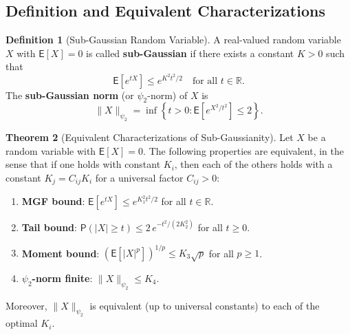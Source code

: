 \documentclass[12pt,a4paper]{article}
\theoremstyle{definition}
\newtheorem{theorem}{Theorem}[section]
\newtheorem{definition}[theorem]{Definition}
\newcommand\expc{\mathsf{E}}
\newcommand\prb{\mathsf{P}}
\newcommand{\Real}{\mathbb{R}}
\begin{document}
\subsection{Definition and Equivalent Characterizations}

\begin{definition}[Sub-Gaussian Random Variable]\label{def:subgaussian}
A real-valued random variable $X$ with $\expc[X] = 0$ is called \textbf{sub-Gaussian} if there exists a constant $K > 0$ such that
\begin{equation}\label{eq:subgaussian-mgf}
\expc\!\left[e^{tX}\right] \leqslant e^{K^2 t^2/2} \quad \text{for all } t \in \Real.
\end{equation}
The \textbf{sub-Gaussian norm} (or $\psi_2$-norm) of $X$ is
\begin{equation}\label{eq:psi2}
\|X\|_{\psi_2} = \inf\!\left\{t > 0 : \expc\!\left[e^{X^2/t^2}\right] \leqslant 2\right\}.
\end{equation}
\end{definition}

\begin{theorem}[Equivalent Characterizations of Sub-Gaussianity]\label{thm:subgaussian-equiv}
Let $X$ be a random variable with $\expc[X] = 0$. The following properties are equivalent, in the sense that if one holds with constant $K_i$, then each of the others holds with a constant $K_j = C_{ij} K_i$ for a universal factor $C_{ij} > 0$:
\begin{enumerate}[label=\textup{(\roman*)}]
\item\label{sg:mgf} \textbf{MGF bound}: $\expc[e^{tX}] \leqslant e^{K_1^2 t^2/2}$ for all $t \in \Real$.
\item\label{sg:tail} \textbf{Tail bound}: $\prb(|X| \geqslant t) \leqslant 2\,e^{-t^2/(2K_2^2)}$ for all $t \geqslant 0$.
\item\label{sg:moment} \textbf{Moment bound}: $(\expc[|X|^p])^{1/p} \leqslant K_3\sqrt{p}$ for all $p \geqslant 1$.
\item\label{sg:psi2} \textbf{$\psi_2$-norm finite}: $\|X\|_{\psi_2} \leqslant K_4$.
\end{enumerate}
Moreover, $\|X\|_{\psi_2}$ is equivalent (up to universal constants) to each of the optimal $K_i$.
\end{theorem}
\end{document}
